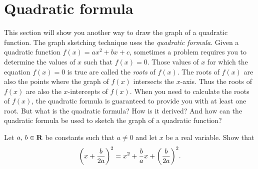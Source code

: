 \documentclass[a4paper,oneside,12pt]{article}
\begin{document}

\section{Quadratic formula}
\label{sec:quadratic_formula}

This section will show you another way to draw the graph of a
quadratic function.  The graph sketching technique uses the
\emph{quadratic formula}.  Given a quadratic function
$f(x) = ax^2 + bx + c$, sometimes a problem requires you to determine
the values of $x$ such that $f(x) = 0$.  Those values of $x$ for which
the equation $f(x) = 0$ is true are called the \emph{roots} of
$f(x)$.  The roots of $f(x)$ are also the points where the graph of
$f(x)$ intersects the $x$-axis.  Thus the roots of $f(x)$ are also the
$x$-intercepts of $f(x)$.  When you need to calculate the roots of
$f(x)$, the quadratic formula is guaranteed to provide you with at
least one root.  But what is the quadratic formula?  How is it
derived?  And how can the quadratic formula be used to sketch the
graph of a quadratic function?

\begin{exercise}
\label{ex:completing_the_square}
Let ${a},\, {b} \in \mathbf{R}$ be constants such that $a \neq 0$ and let
$x$ be a real variable.  Show that
\[
\parenthesis*{x + \frac{b}{2a}}^2
=
x^2 + \frac{b}{a} x + \parenthesis*{\frac{b}{2a}}^2.
\]
\end{exercise}
\end{document}
